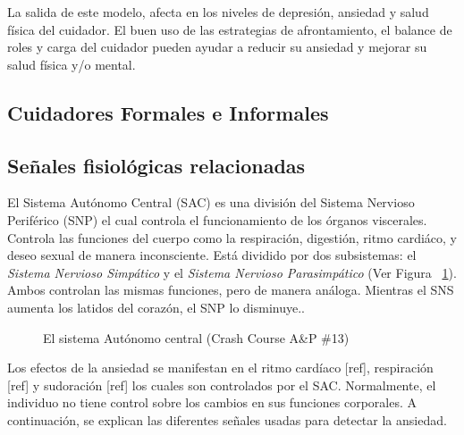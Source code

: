 	La salida de este modelo, afecta en los niveles de depresi\'on, ansiedad y salud f\'isica del cuidador. El buen uso de las estrategias de afrontamiento, el balance de roles y carga del cuidador pueden ayudar a reducir su ansiedad y mejorar su salud f\'isica y/o mental.

	\subsection{Cuidadores Formales e Informales}\label{secc:caregivers}


	\subsection{Se\~nales fisiol\'ogicas relacionadas}\label{secc:signals}
	El Sistema Aut\'onomo Central (SAC) es una divisi\'on del Sistema Nervioso Perif\'erico (SNP) el cual controla el funcionamiento de los \'organos viscerales. Controla las funciones del cuerpo como la respiraci\'on, digesti\'on, ritmo cardi\'aco, y deseo sexual de manera inconsciente. Est\'a dividido por dos subsistemas: el \textit{Sistema Nervioso Simp\'atico} y el \textit{Sistema Nervioso Parasimp\'atico} (Ver Figura ~\ref{fig:modeloSNP}). Ambos controlan las mismas funciones, pero de manera an\'aloga. Mientras el SNS aumenta los latidos del coraz\'on, el SNP lo disminuye..

\begin{figure}[h]
	\centering
	\caption{El sistema Aut\'onomo central (Crash Course A\&P \#13) \label{fig:modeloSNP}}
\end{figure}

Los efectos de la ansiedad se manifestan en el ritmo card\'iaco [ref], respiraci\'on [ref] y sudoraci\'on [ref] los cuales son controlados por el SAC. Normalmente, el individuo no tiene control sobre los cambios en sus funciones corporales. A continuaci\'on, se explican las diferentes se\~nales usadas para detectar la ansiedad.

